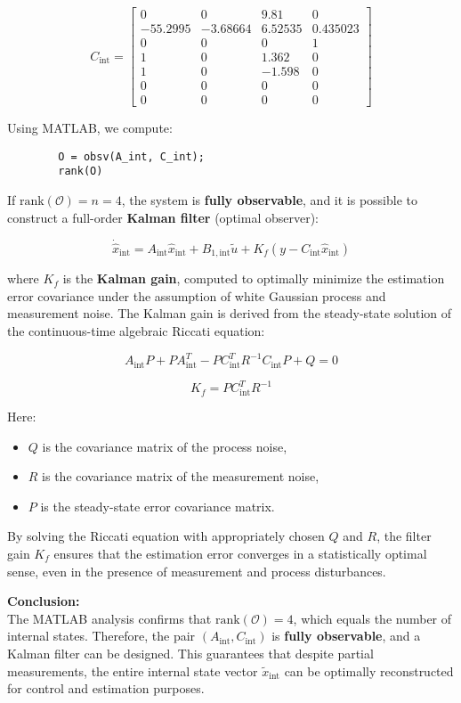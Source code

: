 \documentclass[]{report}
\begin{document}
	\[
	C_{\text{int}} =
	\begin{bmatrix}
		0 & 0 & 9.81 & 0 \\
		-55.2995 & -3.68664 & 6.52535 & 0.435023 \\
		0 & 0 & 0 & 1 \\
		1 & 0 & 1.362 & 0  \\
		1 & 0 & -1.598 & 0 \\
		0 & 0 & 0 & 0 \\
		0 & 0 & 0 & 0 
	\end{bmatrix}
	\]
	
	Using MATLAB, we compute:
	
	\begin{verbatim}
		O = obsv(A_int, C_int);
		rank(O)
	\end{verbatim}
	
	If $\text{rank}(\mathcal{O}) = n = 4$, the system is \textbf{fully observable}, and it is possible to construct a full-order \textbf{Kalman filter} (optimal observer):
	
	\[
	\dot{\hat{x}}_{\text{int}} = A_{\text{int}} \hat{x}_{\text{int}} + B_{1,\text{int}} \tilde{u} + K_f(y - C_{\text{int}} \hat{x}_{\text{int}})
	\]
	
	where $K_f$ is the \textbf{Kalman gain}, computed to optimally minimize the estimation error covariance under the assumption of white Gaussian process and measurement noise. The Kalman gain is derived from the steady-state solution of the continuous-time algebraic Riccati equation:
	
	\[
	A_{\text{int}} P + P A_{\text{int}}^T - P C_{\text{int}}^T R^{-1} C_{\text{int}} P + Q = 0
	\]
	
	\[
	K_f = P C_{\text{int}}^T R^{-1}
	\]
	
	Here:
	\begin{itemize}
		\item $Q$ is the covariance matrix of the process noise,
		\item $R$ is the covariance matrix of the measurement noise,
		\item $P$ is the steady-state error covariance matrix.
	\end{itemize}
	
	By solving the Riccati equation with appropriately chosen $Q$ and $R$, the filter gain $K_f$ ensures that the estimation error converges in a statistically optimal sense, even in the presence of measurement and process disturbances.
	
	
	
	\textbf{Conclusion:} \\
	The MATLAB analysis confirms that $\text{rank}(\mathcal{O}) = 4$, which equals the number of internal states. Therefore, the pair $(A_{\text{int}}, C_{\text{int}})$ is \textbf{fully observable}, and a Kalman filter can be designed. This guarantees that despite partial measurements, the entire internal state vector $\tilde{x}_{\text{int}}$ can be optimally reconstructed for control and estimation purposes.
	
\end{document}
